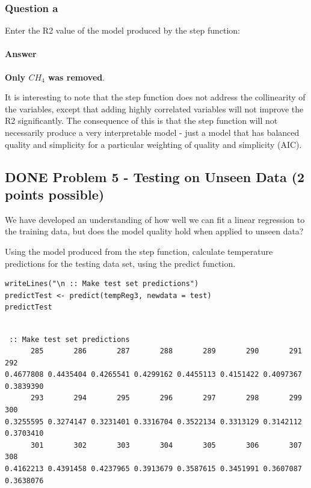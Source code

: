 \documentclass[letterpaper, 9pt, onecolumn, twoside, technote, final]{IEEEtran}
\begin{document}
\subsubsection{Question a}
\label{sec-1-6-1}

Enter the R2 value of the model produced by the step function:

\paragraph{Answer}
\label{sec-1-6-1-1}

\textbf{Only $CH_4$ was removed}.

It is interesting to note that the step function does not address the
collinearity of the variables, except that adding highly correlated
variables will not improve the R2 significantly. The consequence of
this is that the step function will not necessarily produce a very
interpretable model - just a model that has balanced quality and
simplicity for a particular weighting of quality and simplicity
(AIC).

\subsection{{\bfseries\sffamily DONE} Problem 5 - Testing on Unseen Data (2 points possible)}
\label{sec-1-7}
We have developed an understanding of how well we can fit a linear
regression to the training data, but does the model quality hold when
applied to unseen data?

Using the model produced from the step function, calculate temperature
predictions for the testing data set, using the predict function.

\begin{verbatim}
writeLines("\n :: Make test set predictions")
predictTest <- predict(tempReg3, newdata = test)
predictTest
\end{verbatim}

\begin{verbatim}

 :: Make test set predictions
      285       286       287       288       289       290       291       292
0.4677808 0.4435404 0.4265541 0.4299162 0.4455113 0.4151422 0.4097367 0.3839390
      293       294       295       296       297       298       299       300
0.3255595 0.3274147 0.3231401 0.3316704 0.3522134 0.3313129 0.3142112 0.3703410
      301       302       303       304       305       306       307       308
0.4162213 0.4391458 0.4237965 0.3913679 0.3587615 0.3451991 0.3607087 0.3638076
\end{verbatim}
\end{document}
